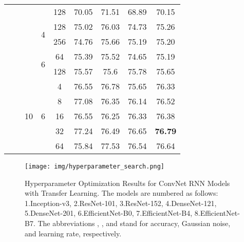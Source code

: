 \documentclass[fleqn,10pt]{wlscirep}
\begin{document}
\begin{table*}
{\begin{tabular}{|c|c|c|c|c|c|c|c|c|}
\cline{5-9}
                                           &                       &                     &                    & 128        & 70.05 & 71.51 & 68.89 & 70.15  \\ 
\cline{4-9}
                                           &                       &                     & \multirow{2}{*}{4} & 128        & 75.02 & 76.03 & 74.73 & 75.26  \\ 
\cline{5-9}
                                           &                       &                     &                    & 256        & 74.76 & 75.66 & 75.19 & 75.20  \\ 
\cline{4-9}
                                           &                       &                     & \multirow{2}{*}{6} & 64         & 75.39 & 75.52 & 74.65 & 75.19  \\ 
\cline{5-9}
                                           &                       &                     &                    & 128        & 75.57 & 75.6  & 75.78 & 75.65  \\ 
\cline{3-9}
                                           &                       & \multirow{5}{*}{10} & \multirow{5}{*}{6} & 4          & 76.55 & 76.78 & 75.65 & 76.33  \\ 
\cline{5-9}
                                           &                       &                     &                    & 8          & 77.08 & 76.35 & 76.14 & 76.52  \\ 
\cline{5-9}
                                           &                       &                     &                    & 16         & 76.55 & 76.25 & 76.33 & 76.38  \\ 
\cline{5-9}
                                           &                       &                     &                    & 32         & 77.24 & 76.49 & 76.65 & \textbf{76.79}  \\ 
\cline{5-9}
                                           &                       &                     &                    & 64         & 75.84 & 77.53 & 76.54 & 76.64  \\
\hline
\end{tabular}
}
\end{table*} \begin{figure}[htb!]
\begin{center}
\texttt{[image: img/hyperparameter\_search.png]}
\caption{Hyperparameter Optimization Results for ConvNet RNN Models with Transfer Learning. The models are numbered as follows: 1.Inception-v3, 2.ResNet-101, 3.ResNet-152, 4.DenseNet-121, 5.DenseNet-201, 6.EfficientNet-B0, 7.EfficientNet-B4, 8.EfficientNet-B7. The abbreviations , , and  stand for accuracy, Gaussian noise, and learning rate, respectively.}
\label{fig:hyperparameter_search}
\end{center}
\end{figure}
\end{document}
